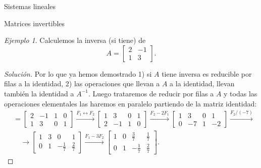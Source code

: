 \documentclass[a4paper,12pt,twoside,spanish,reqno]{amsbook}
\numberwithin{equation}{section}
\theoremstyle{definition}
\theoremstyle{remark}
\newtheorem*{ejemplo*}{Ejemplo}
\newcommand{\Id}{\operatorname{Id}}
\begin{document}
\begin{chapter}{Sistemas lineales}
\begin{section}{Matrices invertibles}
            \begin{ejemplo*}
                Calculemos la inversa (si tiene) de 
                \begin{equation*}
                A=\begin{bmatrix}2&-1\\1&3 \end{bmatrix}.
                \end{equation*}
            \end{ejemplo*}
            \begin{proof}[Solución] Por lo que ya hemos demostrado 1) si $A$ tiene inversa es reducible por filas a la identidad, 2) las operaciones que llevan a $A$ a la identidad, llevan también la identidad  a $A^{-1}$. Luego  trataremos de reducir por filas a $A$ y todas las operaciones elementales las haremos en paralelo partiendo de la matriz identidad:
                \begin{align*}
                [A|\Id] &= \left[\begin{array}{cc|cc}2&-1 &  1&0\\1&3& 0&1\end{array}\right] 
                \stackrel{F_1\leftrightarrow F_2}{\longrightarrow} 
                \left[\begin{array}{cc|cc}1&3& 0&1\\2&-1 &  1&0 \end{array}\right]
                \stackrel{F_2-2 F_1}{\longrightarrow}
                \left[\begin{array}{cc|cc}1&3& 0&1\\0&-7 &  1&-2 \end{array}\right]
                \stackrel{F_2/(-7)}{\longrightarrow}\\
                &\quad\longrightarrow 
                \left[\begin{array}{cc|cc}1&3& 0&1\\0&1 &  -\frac17&\frac27\end{array}\right]
                \stackrel{F_1-3 F_2}{\longrightarrow}
                \left[\begin{array}{cc|cc}1&0&  \frac37&\frac17\\0&1 &  -\frac17&\frac27 \end{array}\right].

\end{align*}
\end{proof}
\end{section}
\end{chapter}
\end{document}
